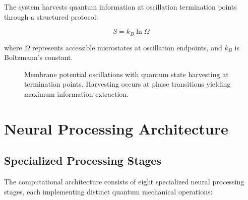 \documentclass[12pt,a4paper]{article}
\begin{document}
The system harvests quantum information at oscillation termination points through a structured protocol:

\begin{equation}
S = k_B \ln \Omega
\label{eq:entropy}
\end{equation}

where $\Omega$ represents accessible microstates at oscillation endpoints, and $k_B$ is Boltzmann's constant.

\begin{figure}[H]
\centering
{}
\caption{Membrane potential oscillations with quantum state harvesting at termination points. Harvesting occurs at phase transitions yielding maximum information extraction.}
\label{fig:oscillation_harvest}
\end{figure}

\section{Neural Processing Architecture}

\subsection{Specialized Processing Stages}

The computational architecture consists of eight specialized neural processing stages, each implementing distinct quantum mechanical operations:
\end{document}
